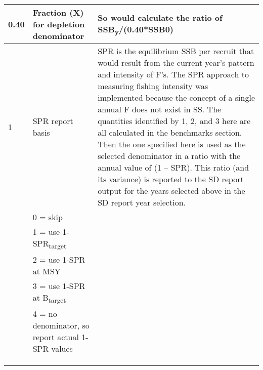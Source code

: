 \begin{landscape}
\begin{longtable}{p{1.5cm} p{7cm} p{12.5cm}}
 \hline
 0.40 & Fraction (X) for depletion denominator & So would calculate the ratio of SSB\textsubscript{y}/(0.40*SSB0)\\

 \hline
 1 & SPR report basis & \multirow{1}{1cm}[-0.1cm]{\parbox{12.5cm}{SPR is the equilibrium SSB per recruit that would result from the current year’s pattern and intensity of F’s.  The SPR approach to measuring fishing intensity was implemented because the concept of a single annual F does not exist in SS.
 The quantities identified by 1, 2, and 3 here are all calculated in the benchmarks section.  Then the one specified here is used as the selected denominator in a ratio with the annual value of (1 – SPR). This ratio (and its variance) is reported to the SD report output for the years selected above in the SD report year selection.}}\\
   & 0 = skip & \\
   & 1 = use 1-SPR\textsubscript{target} & \\
   & 2 = use 1-SPR at MSY & \\
   & 3 = use 1-SPR at B\textsubscript{target} & \\
   & 4 = no denominator, so report actual 1-SPR values & \\
   & & \\
   & & \\
   & & \\
  

\end{longtable}
\end{landscape}
